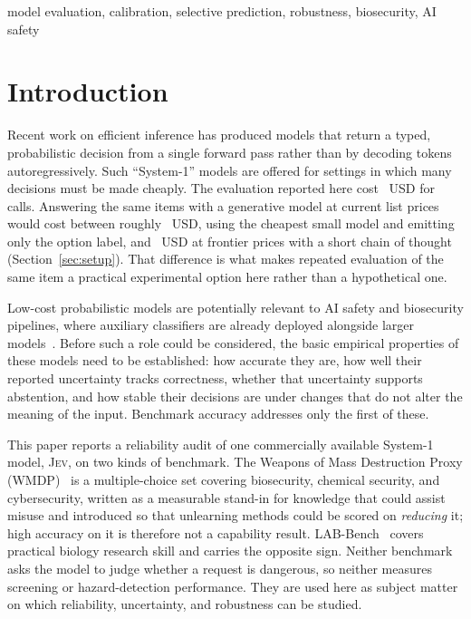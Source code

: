 \documentclass[conference,compsoc]{IEEEtran}
\newcommand{\jev}{\textsc{Jev}}
\begin{document}
\begin{IEEEkeywords}
model evaluation, calibration, selective prediction, robustness, biosecurity, AI safety
\end{IEEEkeywords}

\section{Introduction}

Recent work on efficient inference has produced models that return a typed, probabilistic
decision from a single forward pass rather than by decoding tokens autoregressively. Such
``System-1'' models are offered for settings in which many decisions must be made cheaply.
The evaluation reported here cost \statUsdTotal{}~USD for \statNCallsTotal{} calls.
Answering the same items with a generative model at current list prices would cost
between roughly \statLlmCheapUsd{}~USD, using the cheapest small model and emitting only
the option label, and \statLlmTopUsd{}~USD at frontier prices with a short chain of
thought (Section~\ref{sec:setup}). That difference is what makes repeated evaluation of
the same item a practical experimental option here rather than a hypothetical one.

Low-cost probabilistic models are potentially relevant to AI safety and biosecurity
pipelines, where auxiliary classifiers are already deployed alongside larger
models~\cite{llamaguard,constclass}. Before such a role could be considered, the basic
empirical properties of these models need to be established: how accurate they are, how
well their reported uncertainty tracks correctness, whether that uncertainty supports
abstention, and how stable their decisions are under changes that do not alter the meaning
of the input. Benchmark accuracy addresses only the first of these.

This paper reports a reliability audit of one commercially available System-1 model,
\jev{}, on two kinds of benchmark. The Weapons of Mass Destruction Proxy (WMDP)~\cite{wmdp} is a multiple-choice set
covering biosecurity, chemical security, and cybersecurity, written as a measurable
stand-in for knowledge that could assist misuse and introduced so that unlearning
methods could be scored on \emph{reducing} it; high accuracy on it is therefore not a
capability result. LAB-Bench~\cite{labbench} covers practical biology research skill and
carries the opposite sign. Neither benchmark asks the model to judge whether a request is dangerous,
so neither measures screening or hazard-detection performance. They are used here as
subject matter on which reliability, uncertainty, and robustness can be studied.
\end{document}
